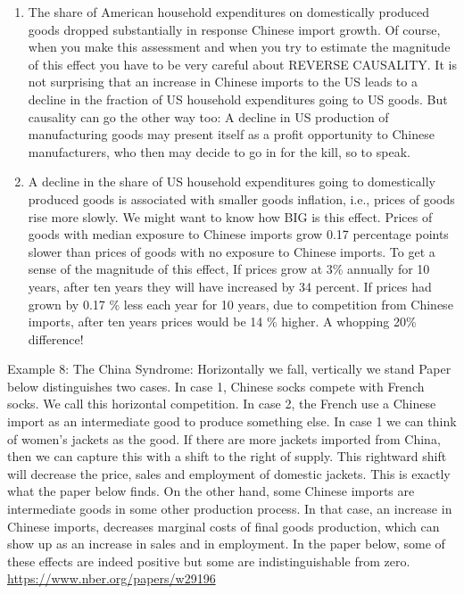 \documentclass[
]{book}
\providecommand{\tightlist}{%
  \setlength{\itemsep}{0pt}\setlength{\parskip}{0pt}}
\begin{document}
\begin{enumerate}
\def\labelenumi{\arabic{enumi}.}
\tightlist
\item
  The share of American household expenditures on domestically produced goods dropped substantially in response Chinese import growth.
  Of course, when you make this assessment and when you try to estimate the magnitude of this effect you have to be very careful about REVERSE CAUSALITY. It is not surprising that an increase in Chinese imports to the US leads to a decline in the fraction of US household expenditures going to US goods. But causality can go the other way too: A decline in US production of manufacturing goods may present itself as a profit opportunity to Chinese manufacturers, who then may decide to go in for the kill, so to speak.
\item
  A decline in the share of US household expenditures going to domestically produced goods is associated with smaller goods inflation, i.e., prices of goods rise more slowly.
  We might want to know how BIG is this effect. Prices of goods with median exposure to Chinese imports grow 0.17 percentage points slower than prices of goods with no exposure to Chinese imports.
  To get a sense of the magnitude of this effect, If prices grow at 3\% annually for 10 years, after ten years they will have increased by 34 percent. If prices had grown by 0.17 \% less each year for 10 years, due to competition from Chinese imports, after ten years prices would be 14 \% higher.
  A whopping 20\% difference!
\end{enumerate}

Example 8: The China Syndrome: Horizontally we fall, vertically we stand
Paper below distinguishes two cases. In case 1, Chinese socks compete with French socks. We call this horizontal competition. In case 2, the French use a Chinese import as an intermediate good to produce something else. In case 1 we can think of women's jackets as the good. If there are more jackets imported from China, then we can capture this with a shift to the right of supply. This rightward shift will decrease the price, sales and employment of domestic jackets. This is exactly what the paper below finds.
On the other hand, some Chinese imports are intermediate goods in some other production process. In that case, an increase in Chinese imports, decreases marginal costs of final goods production, which can show up as an increase in sales and in employment. In the paper below, some of these effects are indeed positive but some are indistinguishable from zero.
\url{https://www.nber.org/papers/w29196}
\end{document}
